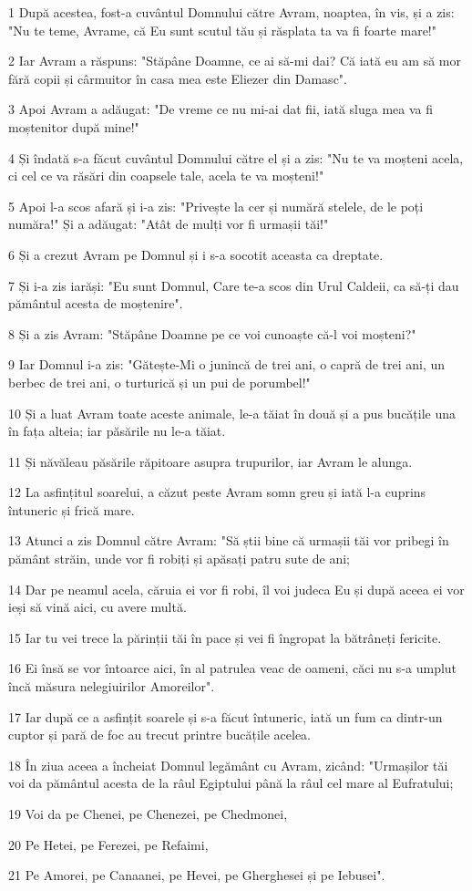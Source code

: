 \par 1 După acestea, fost-a cuvântul Domnului către Avram, noaptea, în vis, și a zis: "Nu te teme, Avrame, că Eu sunt scutul tău și răsplata ta va fi foarte mare!"
\par 2 Iar Avram a răspuns: "Stăpâne Doamne, ce ai să-mi dai? Că iată eu am să mor fără copii și cârmuitor în casa mea este Eliezer din Damasc".
\par 3 Apoi Avram a adăugat: "De vreme ce nu mi-ai dat fii, iată sluga mea va fi moștenitor după mine!"
\par 4 Și îndată s-a făcut cuvântul Domnului către el și a zis: "Nu te va moșteni acela, ci cel ce va răsări din coapsele tale, acela te va moșteni!"
\par 5 Apoi l-a scos afară și i-a zis: "Privește la cer și numără stelele, de le poți număra!" Și a adăugat: "Atât de mulți vor fi urmașii tăi!"
\par 6 Și a crezut Avram pe Domnul și i s-a socotit aceasta ca dreptate.
\par 7 Și i-a zis iarăși: "Eu sunt Domnul, Care te-a scos din Urul Caldeii, ca să-ți dau pământul acesta de moștenire".
\par 8 Și a zis Avram: "Stăpâne Doamne pe ce voi cunoaște că-l voi moșteni?"
\par 9 Iar Domnul i-a zis: "Gătește-Mi o junincă de trei ani, o capră de trei ani, un berbec de trei ani, o turturică și un pui de porumbel!"
\par 10 Și a luat Avram toate aceste animale, le-a tăiat în două și a pus bucățile una în fața alteia; iar păsările nu le-a tăiat.
\par 11 Și năvăleau păsările răpitoare asupra trupurilor, iar Avram le alunga.
\par 12 La asfințitul soarelui, a căzut peste Avram somn greu și iată l-a cuprins întuneric și frică mare.
\par 13 Atunci a zis Domnul către Avram: "Să știi bine că urmașii tăi vor pribegi în pământ străin, unde vor fi robiți și apăsați patru sute de ani;
\par 14 Dar pe neamul acela, căruia ei vor fi robi, îl voi judeca Eu și după aceea ei vor ieși să vină aici, cu avere multă.
\par 15 Iar tu vei trece la părinții tăi în pace și vei fi îngropat la bătrâneți fericite.
\par 16 Ei însă se vor întoarce aici, în al patrulea veac de oameni, căci nu s-a umplut încă măsura nelegiuirilor Amoreilor".
\par 17 Iar după ce a asfințit soarele și s-a făcut întuneric, iată un fum ca dintr-un cuptor și pară de foc au trecut printre bucățile acelea.
\par 18 În ziua aceea a încheiat Domnul legământ cu Avram, zicând: "Urmașilor tăi voi da pământul acesta de la râul Egiptului până la râul cel mare al Eufratului;
\par 19 Voi da pe Chenei, pe Chenezei, pe Chedmonei,
\par 20 Pe Hetei, pe Ferezei, pe Refaimi,
\par 21 Pe Amorei, pe Canaanei, pe Hevei, pe Gherghesei și pe Iebusei".

